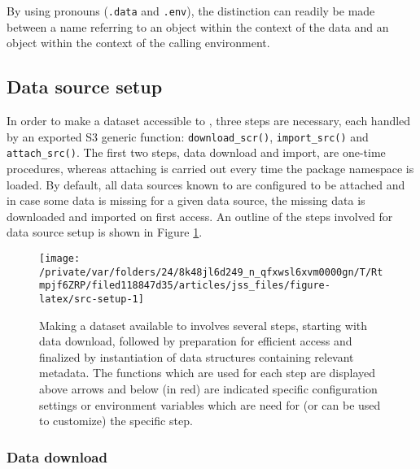 \documentclass[
  notitle,
  nojss,
  noheadings]{jss}
\begin{document}
By using  pronouns (\texttt{.data} and \texttt{.env}), the
distinction can readily be made between a name referring to an object
within the context of the data and an object within the context of the
calling environment.

\hypertarget{data-source-setup}{%
\subsection{Data source setup}\label{data-source-setup}}

In order to make a dataset accessible to , three steps are
necessary, each handled by an exported S3 generic function:
\texttt{download\_scr()}, \texttt{import\_src()} and
\texttt{attach\_src()}. The first two steps, data download and import,
are one-time procedures, whereas attaching is carried out every time the
package namespace is loaded. By default, all data sources known to
 are configured to be attached and in case some data is
missing for a given data source, the missing data is downloaded and
imported on first access. An outline of the steps involved for data
source setup is shown in Figure \ref{fig:src-setup}.

\begin{CodeChunk}
\begin{figure}

{\centering \texttt{[image: /private/var/folders/24/8k48jl6d249\_n\_qfxwsl6xvm0000gn/T/Rtmpjf6ZRP/filed118847d35/articles/jss\_files/figure-latex/src-setup-1]} 

}

\caption[Making a dataset available to  involves several steps, starting with data download, followed by preparation for efficient access and finalized by instantiation of data structures containing relevant metadata]{Making a dataset available to  involves several steps, starting with data download, followed by preparation for efficient access and finalized by instantiation of data structures containing relevant metadata. The functions which are used for each step are displayed above arrows and below (in red) are indicated specific configuration settings or environment variables which are need for (or can be used to customize) the specific step.}\label{fig:src-setup}
\end{figure}
\end{CodeChunk}

\hypertarget{data-download}{%
\subsubsection{Data download}\label{data-download}}
\end{document}
